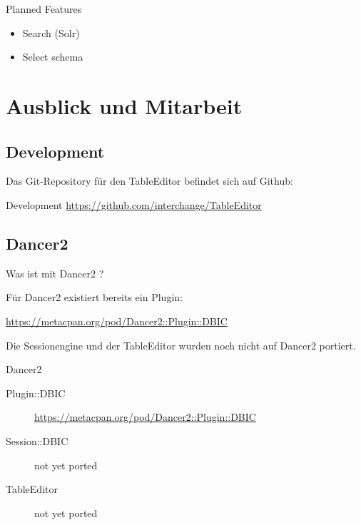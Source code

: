 \begin{frame}{Planned Features}
\begin{itemize}
\item Search (Solr)
\item Select schema
\end{itemize}
\end{frame}

\section{Ausblick und Mitarbeit}

\subsection{Development}

Das Git-Repository für den TableEditor befindet sich auf Github:

\begin{frame}{Development}
\url{https://github.com/interchange/TableEditor}
\end{frame}

\subsection{Dancer2}

Was ist mit Dancer2 ?

Für Dancer2 existiert bereits ein Plugin:

\url{https://metacpan.org/pod/Dancer2::Plugin::DBIC}

Die Sessionengine und der TableEditor wurden noch nicht auf Dancer2 portiert.

\begin{frame}{Dancer2}
  \begin{description}
  \item[Plugin::DBIC] \url{https://metacpan.org/pod/Dancer2::Plugin::DBIC}
  \item[Session::DBIC] not yet ported
  \item[TableEditor] not yet ported
  \end{description}
\end{frame}






